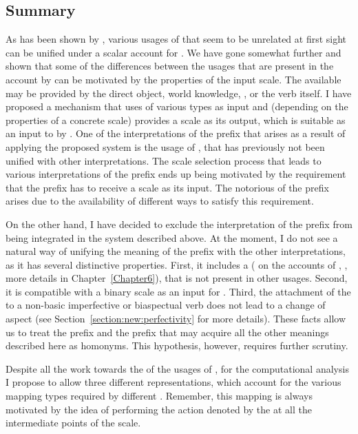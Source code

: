 \subsection{Summary}
As has been shown by \citet{Kagan:book}, various usages of  that seem to be unrelated at first sight can be unified under a scalar account for . We have gone somewhat further and shown that some of the differences between the usages that are present in the account by \citet{Kagan:book} can be motivated by the properties of the input scale. The available  may be provided by the direct object, world knowledge, , or the verb itself. I have proposed a mechanism that uses  of various types as input and (depending on the properties of a concrete scale) provides a scale as its output, which is suitable as an input to  by . One of the interpretations of the prefix that arises as a result of applying the proposed system is the  usage of , that has previously not been unified with other interpretations. The scale selection process that leads to various interpretations of the prefix ends up being motivated by the requirement that the prefix has to receive a  scale as its input. The notorious  of the prefix  arises due to the availability of different ways to satisfy this requirement. 

On the other hand, I have decided to exclude the  interpretation of the prefix  from being integrated in the system described above. At the moment, I do not see a natural way of unifying the  meaning of the prefix with the other interpretations, as it has several distinctive properties. First, it includes a  ( on the accounts of \citealt{Demjjanow:97}, \citealt{Kagan:book}, more details in Chapter~\ref{Chapter6}), that is not present in other usages. Second, it is compatible with a binary scale as an input for . Third, the attachment of the   to a non-basic imperfective or biaspectual verb does not lead to a change of aspect (see Section~\ref{section:new:perfectivity} for more details). These facts allow us to treat the  prefix  and the prefix  that may acquire all the other meanings described here as homonyms. This hypothesis, however, requires further scrutiny.

Despite all the work towards the  of the usages of , for the computational analysis I propose to allow three different representations, which account for the various mapping types required by different . Remember, this mapping is always motivated by the idea of performing the action denoted by the  at all the intermediate points of the scale. 

